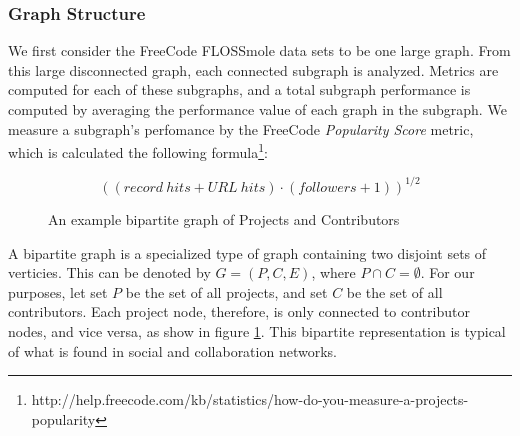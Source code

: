 \documentclass{proc}
\begin{document}
\subsubsection{Graph Structure}
We first consider the FreeCode FLOSSmole\cite{floss2006} data sets to be one large graph. From this large disconnected graph, each connected subgraph is analyzed. Metrics are computed for each of these subgraphs, and a total subgraph performance is computed by averaging the performance value of each graph in the subgraph. We measure a subgraph's perfomance by the FreeCode \textit{Popularity Score} metric, which is calculated the following formula\footnote{http://help.freecode.com/kb/statistics/how-do-you-measure-a-projects-popularity}:

\[ ((record\ hits + URL\ hits) \cdot (followers + 1))^{1/2} \]

\begin{figure}
\centering
{}
\caption{An example bipartite graph of Projects and Contributors}
\label{fig:example_bipartite_graph}
\end{figure}

A bipartite graph is a specialized type of graph containing two disjoint sets of verticies. This can be denoted by ${G=(P,C,E)}$, where ${P \cap C = \emptyset}$. For our purposes, let set $P$ be the set of all projects, and set $C$ be the set of all contributors. Each project node, therefore, is only connected to contributor nodes, and vice versa, as show in figure \ref{fig:example_bipartite_graph}. This bipartite representation is typical of what is found in social and collaboration networks\cite{ramasco2004self}.  
\end{document}
